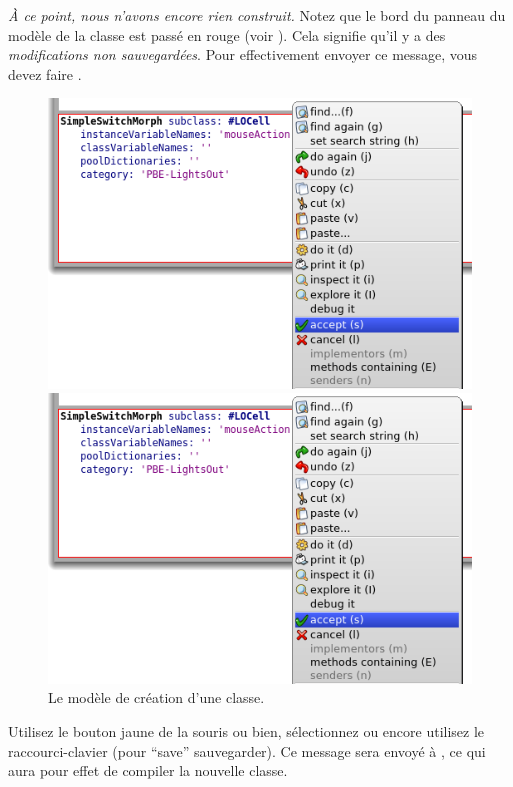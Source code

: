 \documentclass[a4paper,10pt,twoside]{book}
\begin{document}
\emph{À ce point, nous n'avons encore rien construit.}
Notez que le bord du panneau du modèle de la classe est passé en rouge
(voir ).
Cela signifie qu'il y a des \emph{modifications non sauvegardées}.
Pour effectivement envoyer ce message, vous devez faire .

\begin{figure}[h!t]
\ifluluelse
	{\centerline {\includegraphics[width=\textwidth]{AcceptClassDef}}}
	{\centerline {\includegraphics[scale=0.7]{AcceptClassDef}}}
\caption{Le modèle de création d'une classe.
\label{fig:acceptClassDef}}
\end{figure}

Utilisez le bouton jaune de la souris ou bien, sélectionnez
 ou encore utilisez le raccourci-clavier  (pour
``save'' 
\cad sauvegarder).
Ce message sera envoyé à , ce qui aura pour
effet de compiler la nouvelle classe.
\end{document}
